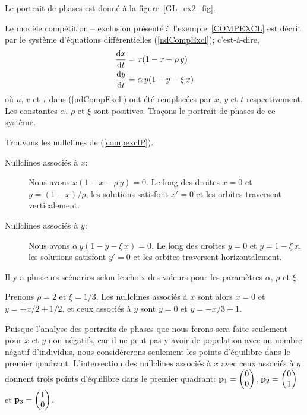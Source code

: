 {\begin{egg}
Le portrait de phases est donné à la figure~\ref{GL_ex2_fig}.
\end{egg}


\begin{egg}
Le modèle compétition -- exclusion présenté à l'exemple~\ref{COMPEXCL}
est décrit par le système d'équations différentielles (\ref{ndCompExcl});
c'est-à-dire,
\begin{equation} \label{compexclP}
\begin{split}
\frac{\mathrm{d}x}{\mathrm{d}t} &= x(1-x - \rho\,y) \\
\frac{\mathrm{d}y}{\mathrm{d}t} &= \alpha \,y(1-y-\xi\,x)
\end{split}
\end{equation}
où $u$, $v$ et $\tau$ dans (\ref{ndCompExcl}) ont été remplacées par
$x$, $y$ et $t$ respectivement.  Les constantes $\alpha$, $\rho$ et
$\xi$ sont positives.  Traçons le portrait de phases de ce système.

Trouvons les nullclines de (\ref{compexclP}).
\begin{description}
\item[Nullclines associés à $x$:] Nous avons $x(1-x-\rho\,y) = 0$.  Le long des
droites $x=0$ et $y= (1-x)/\rho$, les solutions satisfont
$x' = 0$ et les orbites traversent verticalement.
\item[Nullclines associés à $y$:] Nous avons $\alpha \,y(1-y-\xi\,x) = 0$.
Le long des droites $y=0$ et $y=1-\xi\,x$, les solutions satisfont
$y' =0$ et les orbites traversent horizontalement.
\end{description}

Il y a plusieurs scénarios selon le choix des valeurs pour les paramètres
$\alpha$, $\rho$ et $\xi$.

 Prenons $\rho=2$ et $\xi = 1/3$.  Les nullclines associés à $x$ sont
alors $x=0$ et $y= -x/2 + 1/2$, et ceux associés à $y$ sont $y=0$ et
$y= -x/3 + 1$.

Puisque l'analyse des portraits de phases que nous ferons sera faite
seulement pour $x$ et $y$ non négatifs, car il ne peut pas y avoir de
population avec un nombre négatif d'individus, nous considérerons seulement
les points d'équilibre dans le premier quadrant.  L'intersection des
nullclines associés à $x$ avec ceux associés à $y$ donnent trois points
d'équilibre dans le premier quadrant:
$\displaystyle \mathbf{p}_1 = \begin{pmatrix} 0 \\ 0 \end{pmatrix}$,
$\displaystyle \mathbf{p}_2 = \begin{pmatrix} 0 \\ 1 \end{pmatrix}$
et
$\displaystyle \mathbf{p}_3 = \begin{pmatrix} 1 \\ 0 \end{pmatrix}$.


\end{egg}}
